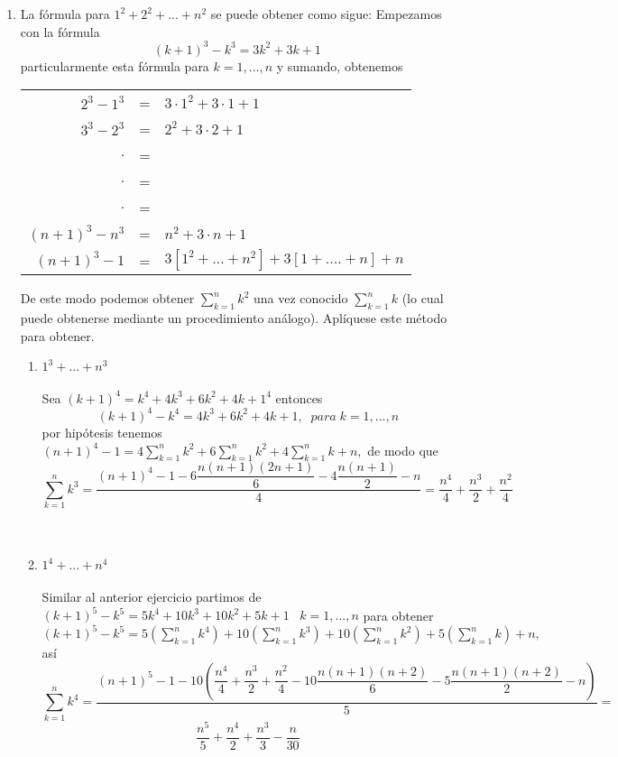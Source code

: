 \begin{enumerate}[\bfseries 1.]
      \item La fórmula para $1^2 + 2^2 + ... + n^2$ se puede obtener como sigue: Empezamos con la fórmula $$(k+1)^3 - k^3 = 3k^2 + 3k +1$$
      particularmente esta fórmula para $k=1,...,n$ \; y sumando, obtenemos
	 \begin{center}
	    \begin{tabular}{r c l}
	       $2^3 - 1^3$&=&$3\cdot 1^2 + 3 \cdot 1 +1$\\
	       $3^3 - 2^3$&=&$2^2 + 3\cdot 2 +1 $\\
	       $.$&=&\\
	       $.$&=&\\
	       $.$&=&\\
	       $(n+1)^3 - n^3$&=&$n^2 + 3 \cdot n + 1$\\
	       \hline
	       $(n+1)^3 - 1$&=&$3 \left[ 1^2 + ... + n^2 \right] + 3 \left[ 1 + .... + n \right] + n$\\
	    \end{tabular}
	 \end{center}
      De este modo podemos obtener $\sum\limits_{k=1}^n k^2$ una vez conocido $\sum\limits_{k=1}^n k $ (lo cual puede obtenerse mediante un procedimiento análogo). Aplíquese este método para obtener.
	 \begin{enumerate}[\bfseries (i)]
	 \item $1^3 + ... + n^3$\\\\
	    Sea $(k+1)^4 = k^4 + 4k^3 + 6k^2 + 4k + 1^4$ entonces $$(k+1)^4 - k^4 = 4k^3 + 6k^2 +4k + 1, \; \; para \; k=1,...,n $$ por hipótesis tenemos $(n+1)^4 - 1 = 4 \sum\limits_{k=1}^n k^2 + 6 \sum\limits_{k=1}^n k^2 + 4 \sum\limits_{k=1}^n k + n,$ de modo que $$\sum\limits_{k=1}^n k^3 = \dfrac{ (n+1)^4 -1 - 6 \dfrac{n(n+1)(2n+1)}{6} - 4 \dfrac{n(n+1)}{2} - n}{4} = \dfrac{n^4}{4} + \dfrac{n^3}{2} + \dfrac{n^2}{4}$$\\\\

	 \item $1^4 + ... + n^4$\\\\
	 Similar al anterior ejercicio partimos de $(k+1)^5 - k^5 = 5k^4 + 10k^3 + 10k^2 + 5k + 1 \; \; \; k=1,...,n$ para obtener $(k+1)^5 - k^5 = 5 \left( \sum\limits_{k=1}^n k^4 \right) + 10 \left( \sum\limits_{k=1}^n k^3 \right) + 10 \left( \sum\limits_{k=1}^n k^2 \right) + 5 \left( \sum\limits_{k=1}^n k \right) + n,$ así $$\sum\limits_{k=1}^n k^4 = \dfrac{(n+1)^5 - 1 - 10\left( \dfrac{n^4}{4} + \dfrac{n^3}{2} + \dfrac{n^2}{4} - 10 \dfrac{n(n+1)(n+2)}{6} - 5 \dfrac{n(n+1)(n+2)}{2} -n \right)}{5} = $$ $$\dfrac{n^5}{5} + \dfrac{n^4}{2} + \dfrac{n^3}{3} - \dfrac{n}{30}$$\\\\


\end{enumerate}
\end{enumerate}
